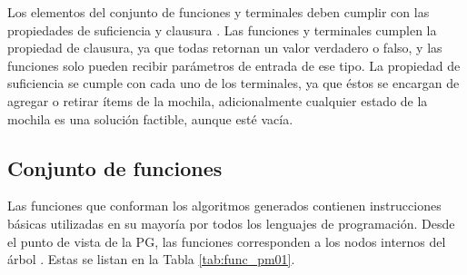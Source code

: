 Los elementos del conjunto de funciones y terminales deben cumplir con las propiedades de suficiencia y clausura \citep{poli_2008}. Las funciones y terminales cumplen la propiedad de clausura, ya que todas retornan un valor verdadero o falso, y las funciones solo pueden recibir parámetros de entrada de ese tipo. La propiedad de suficiencia se cumple con cada uno de los terminales, ya que éstos se encargan de agregar o retirar ítems de la mochila, adicionalmente cualquier estado de la mochila es una solución factible, aunque esté vacía.

\subsection{Conjunto de funciones}

Las funciones que conforman los algoritmos generados contienen instrucciones básicas utilizadas en su mayoría por todos los lenguajes de programación. Desde el punto de vista de la PG, las funciones corresponden a los nodos internos del árbol \citep{koza_poli_2005}. Estas se listan en la Tabla \ref{tab:func_pm01}.

